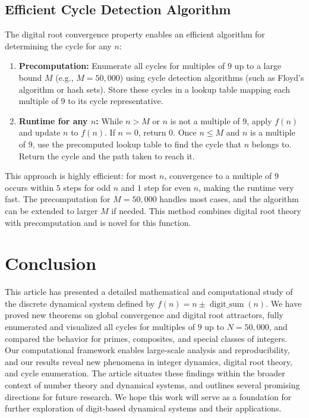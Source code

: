 \documentclass[12pt]{article}
\begin{document}
\subsection{Efficient Cycle Detection Algorithm}
The digital root convergence property enables an efficient algorithm for determining the cycle for any $n$:
\begin{enumerate}
    \item \textbf{Precomputation:} Enumerate all cycles for multiples of $9$ up to a large bound $M$ (e.g., $M = 50,000$) using cycle detection algorithms (such as Floyd's algorithm or hash sets). Store these cycles in a lookup table mapping each multiple of $9$ to its cycle representative.
    \item \textbf{Runtime for any $n$:} While $n > M$ or $n$ is not a multiple of $9$, apply $f(n)$ and update $n$ to $f(n)$. If $n = 0$, return $0$. Once $n \leq M$ and $n$ is a multiple of $9$, use the precomputed lookup table to find the cycle that $n$ belongs to. Return the cycle and the path taken to reach it.
\end{enumerate}
This approach is highly efficient: for most $n$, convergence to a multiple of $9$ occurs within $5$ steps for odd $n$ and $1$ step for even $n$, making the runtime very fast. The precomputation for $M = 50,000$ handles most cases, and the algorithm can be extended to larger $M$ if needed. This method combines digital root theory with precomputation and is novel for this function.


\section{Conclusion}
This article has presented a detailed mathematical and computational study of the discrete dynamical system defined by $f(n) = n \pm \operatorname{digit\_sum}(n)$. We have proved new theorems on global convergence and digital root attractors, fully enumerated and visualized all cycles for multiples of $9$ up to $N=50,000$, and compared the behavior for primes, composites, and special classes of integers. Our computational framework enables large-scale analysis and reproducibility, and our results reveal new phenomena in integer dynamics, digital root theory, and cycle enumeration. The article situates these findings within the broader context of number theory and dynamical systems, and outlines several promising directions for future research. We hope this work will serve as a foundation for further exploration of digit-based dynamical systems and their applications.
\end{document}
